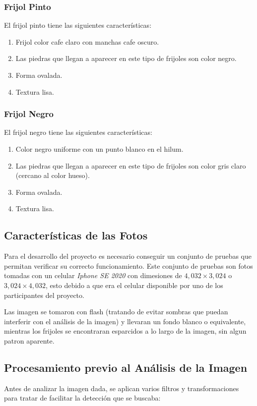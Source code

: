 \documentclass[conference]{IEEEtran}
\begin{document}
    \subsubsection{Frijol Pinto}
    El frijol pinto tiene las siguientes características:
    \begin{enumerate}
        \item Frijol color cafe claro con manchas cafe oscuro.
        \item Las piedras que llegan a aparecer en este tipo de frijoles son color negro.
        \item Forma ovalada.
        \item Textura lisa.
    \end{enumerate}

    \subsubsection{Frijol Negro}
    El frijol negro tiene las siguientes características:
    \begin{enumerate}
        \item Color negro uniforme con un punto blanco en el hilum\cite{semillas}.
        \item Las piedras que llegan a aparecer en este tipo de frijoles son color gris claro (cercano al color hueso\cite{pantone}).
        \item Forma ovalada.
        \item Textura lisa.
    \end{enumerate}

    \subsection{Características de las Fotos}
    Para el desarrollo del proyecto es necesario conseguir un conjunto de pruebas que permitan verificar su correcto funcionamiento. Este conjunto de pruebas son fotos tomadas con un celular \textit{Iphone SE 2020}\cite{iphone} con dimesiones de $4,032 \times 3,024$ o $3,024 \times 4,032$, esto debido a que era el celular disponible por uno de los participantes del proyecto.

    Las imagen se tomaron con flash (tratando de evitar sombras que puedan interferir con el análisis de la imagen) y llevaran un fondo blanco o equivalente, mientras los frijoles se encontraran esparcidos a lo largo de la imagen, sin algun patron aparente.

    \subsection{Procesamiento previo al Análisis de la Imagen}
    Antes de analizar la imagen dada, se aplican varios filtros y transformaciones para tratar de facilitar la detección que se buscaba:
\end{document}
